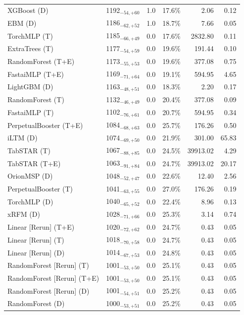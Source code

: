 \begin{tabular}{llccrr}
XGBoost (D) & 1192${}_{-54,+60}$ & 1.0 & 17.6\% & 2.06 & 0.12 \\
EBM (D) & 1186${}_{-62,+52}$ & 1.0 & 18.7\% & 7.66 & 0.05 \\
TorchMLP (T) & 1185${}_{-66,+49}$ & 0.0 & 17.6\% & 2832.80 & 0.11 \\
ExtraTrees (T) & 1177${}_{-54,+59}$ & 0.0 & 19.6\% & 191.44 & 0.10 \\
RandomForest (T+E) & 1173${}_{-55,+53}$ & 0.0 & 19.6\% & 377.08 & 0.75 \\
FastaiMLP (T+E) & 1169${}_{-71,+64}$ & 0.0 & 19.1\% & 594.95 & 4.65 \\
LightGBM (D) & 1163${}_{-48,+51}$ & 0.0 & 18.3\% & 2.20 & 0.17 \\
RandomForest (T) & 1132${}_{-46,+49}$ & 0.0 & 20.4\% & 377.08 & 0.09 \\
FastaiMLP (T) & 1102${}_{-76,+61}$ & 0.0 & 20.7\% & 594.95 & 0.34 \\
PerpetualBooster (T+E) & 1084${}_{-68,+63}$ & 0.0 & 25.7\% & 176.26 & 0.50 \\
iLTM (D) & 1074${}_{-69,+50}$ & 0.0 & 21.9\% & 301.00 & 65.83 \\
TabSTAR (T) & 1067${}_{-88,+85}$ & 0.0 & 24.5\% & 39913.02 & 4.29 \\
TabSTAR (T+E) & 1063${}_{-91,+84}$ & 0.0 & 24.7\% & 39913.02 & 20.17 \\
OrionMSP (D) & 1048${}_{-52,+47}$ & 0.0 & 22.6\% & 12.40 & 2.56 \\
PerpetualBooster (T) & 1041${}_{-63,+55}$ & 0.0 & 27.0\% & 176.26 & 0.19 \\
TorchMLP (D) & 1040${}_{-65,+52}$ & 0.0 & 22.4\% & 8.96 & 0.13 \\
xRFM (D) & 1028${}_{-71,+66}$ & 0.0 & 25.3\% & 3.14 & 0.74 \\
Linear [Rerun] (T+E) & 1020${}_{-72,+62}$ & 0.0 & 24.7\% & 0.43 & 0.05 \\
Linear [Rerun] (T) & 1018${}_{-70,+58}$ & 0.0 & 24.7\% & 0.43 & 0.05 \\
Linear [Rerun] (D) & 1014${}_{-67,+53}$ & 0.0 & 24.8\% & 0.43 & 0.05 \\
RandomForest [Rerun] (T) & 1001${}_{-53,+50}$ & 0.0 & 25.1\% & 0.43 & 0.05 \\
RandomForest [Rerun] (T+E) & 1001${}_{-53,+50}$ & 0.0 & 25.1\% & 0.43 & 0.05 \\
RandomForest [Rerun] (D) & 1001${}_{-54,+51}$ & 0.0 & 25.2\% & 0.43 & 0.05 \\
RandomForest (D) & 1000${}_{-53,+51}$ & 0.0 & 25.2\% & 0.43 & 0.05 \\

\end{tabular}
